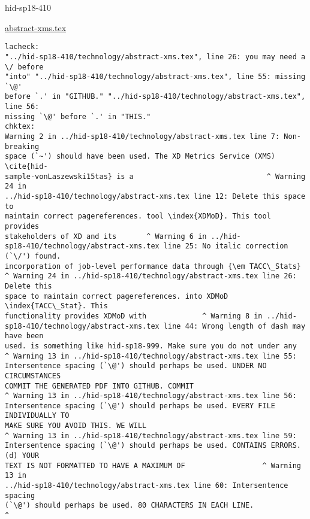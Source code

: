 \begin{IU}

hid-sp18-410

\href{https://github.com/cloudmesh-community/hid-sp18-410/blob/master//technology/abstract-xms.tex}{abstract-xms.tex}

\begin{tiny}
\begin{verbatim}
lacheck:
"../hid-sp18-410/technology/abstract-xms.tex", line 26: you may need a \/ before
"into" "../hid-sp18-410/technology/abstract-xms.tex", line 55: missing `\@'
before `.' in "GITHUB." "../hid-sp18-410/technology/abstract-xms.tex", line 56:
missing `\@' before `.' in "THIS."
chktex:
Warning 2 in ../hid-sp18-410/technology/abstract-xms.tex line 7: Non-breaking
space (`~') should have been used. The XD Metrics Service (XMS) \cite{hid-
sample-vonLaszewski15tas} is a                               ^ Warning 24 in
../hid-sp18-410/technology/abstract-xms.tex line 12: Delete this space to
maintain correct pagereferences. tool \index{XDMoD}. This tool provides
stakeholders of XD and its       ^ Warning 6 in ../hid-
sp18-410/technology/abstract-xms.tex line 25: No italic correction (`\/') found.
incorporation of job-level performance data through {\em TACC\_Stats}
^ Warning 24 in ../hid-sp18-410/technology/abstract-xms.tex line 26: Delete this
space to maintain correct pagereferences. into XDMoD \index{TACC\_Stat}. This
functionality provides XDMoD with             ^ Warning 8 in ../hid-
sp18-410/technology/abstract-xms.tex line 44: Wrong length of dash may have been
used. is something like hid-sp18-999. Make sure you do not under any
^ Warning 13 in ../hid-sp18-410/technology/abstract-xms.tex line 55:
Intersentence spacing (`\@') should perhaps be used. UNDER NO CIRCUMSTANCES
COMMIT THE GENERATED PDF INTO GITHUB. COMMIT
^ Warning 13 in ../hid-sp18-410/technology/abstract-xms.tex line 56:
Intersentence spacing (`\@') should perhaps be used. EVERY FILE INDIVIDUALLY TO
MAKE SURE YOU AVOID THIS. WE WILL
^ Warning 13 in ../hid-sp18-410/technology/abstract-xms.tex line 59:
Intersentence spacing (`\@') should perhaps be used. CONTAINS ERRORS. (d) YOUR
TEXT IS NOT FORMATTED TO HAVE A MAXIMUM OF                  ^ Warning 13 in
../hid-sp18-410/technology/abstract-xms.tex line 60: Intersentence spacing
(`\@') should perhaps be used. 80 CHARACTERS IN EACH LINE.
^
\end{verbatim}
\end{tiny}
\end{IU}



